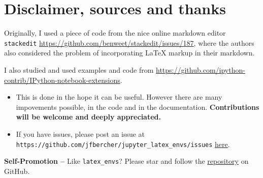     \section{Disclaimer, sources and
thanks}\label{disclaimer-sources-and-thanks}

    Originally, I used a piece of code from the nice online markdown editor
\texttt{stackedit}
\url{https://github.com/benweet/stackedit/issues/187}, where the authors
also considered the problem of incorporating LaTeX markup in their
markdown.

I also studied and used examples and code from
\url{https://github.com/ipython-contrib/IPython-notebook-extensions}.

\begin{itemize}
\item
  This is done in the hope it can be useful. However there are many
  impovements possible, in the code and in the documentation.
  \textbf{Contributions will be welcome and deeply appreciated.}
\item
  If you have issues, please post an issue at
  \texttt{https://github.com/jfbercher/jupyter\_latex\_envs/issues}
  \href{https://github.com/jfbercher/jupyter_latex_envs/issues}{here}.
\end{itemize}

\textbf{Self-Promotion --} Like \texttt{latex\_envs}? Please star and
follow the
\href{https://github.com/jfbercher/jupyter_latex_envs}{repository} on
GitHub.

    
